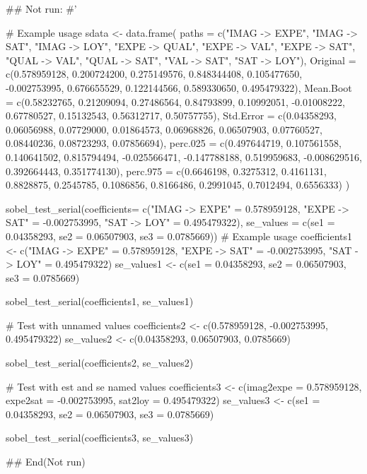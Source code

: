 \documentclass[a4paper]{book}
\begin{document}
\begin{Examples}
\begin{ExampleCode}

\#\# Not run: 
#'

# Example usage
sdata <- data.frame(
  paths = c("IMAG -> EXPE", "IMAG -> SAT",
              "IMAG -> LOY", "EXPE -> QUAL", "EXPE -> VAL", "EXPE -> SAT",
            "QUAL -> VAL", "QUAL -> SAT", "VAL -> SAT", "SAT -> LOY"),
  Original = c(0.578959128, 0.200724200, 0.275149576,
              0.848344408, 0.105477650, -0.002753995,
               0.676655529, 0.122144566, 0.589330650, 0.495479322),
  Mean.Boot = c(0.58232765, 0.21209094, 0.27486564,
                0.84793899, 0.10992051, -0.01008222,
                0.67780527, 0.15132543, 0.56312717, 0.50757755),
  Std.Error = c(0.04358293, 0.06056988, 0.07729000,
                 0.01864573, 0.06968826, 0.06507903,
                0.07760527, 0.08440236, 0.08723293, 0.07856694),
  perc.025 = c(0.497644719, 0.107561558, 0.140641502,
                0.815794494, -0.025566471, -0.147788188,
               0.519959683, -0.008629516, 0.392664443, 0.351774130),
  perc.975 = c(0.6646198, 0.3275312, 0.4161131,
                0.8828875, 0.2545785, 0.1086856,
               0.8166486, 0.2991045, 0.7012494, 0.6556333)
)



sobel_test_serial(coefficients= c("IMAG -> EXPE" = 0.578959128,
                                  "EXPE -> SAT" = -0.002753995,
                                  "SAT -> LOY" = 0.495479322),
                  se_values = c(se1 = 0.04358293,
                                se2 = 0.06507903,
                                se3 = 0.0785669))
# Example usage
coefficients1 <- c("IMAG -> EXPE" = 0.578959128,
                  "EXPE -> SAT" = -0.002753995, "SAT -> LOY" = 0.495479322)
se_values1 <- c(se1 = 0.04358293, se2 = 0.06507903, se3 = 0.0785669)

sobel_test_serial(coefficients1, se_values1)


# Test with unnamed values
coefficients2 <- c(0.578959128, -0.002753995, 0.495479322)
se_values2 <- c(0.04358293, 0.06507903, 0.0785669)

sobel_test_serial(coefficients2, se_values2)


# Test with est and se named values
coefficients3 <- c(imag2expe = 0.578959128,
                  expe2sat = -0.002753995, sat2loy = 0.495479322)
se_values3 <- c(se1 = 0.04358293, se2 = 0.06507903, se3 = 0.0785669)

sobel_test_serial(coefficients3, se_values3)




## End(Not run)


\end{ExampleCode}
\end{Examples}
\end{document}
